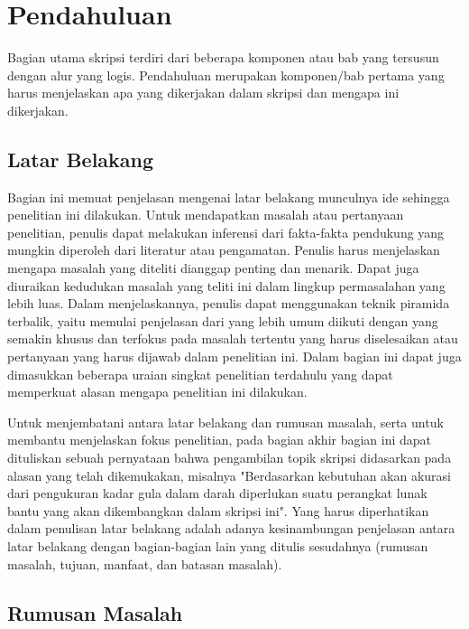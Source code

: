 \newpage
{}
\setcounter{page}{1}


\chapter{Pendahuluan}


Bagian utama skripsi terdiri dari beberapa komponen atau bab yang tersusun dengan alur yang logis. Pendahuluan merupakan komponen/bab pertama yang harus menjelaskan apa yang dikerjakan dalam skripsi dan mengapa ini dikerjakan. 

\section{Latar Belakang}

Bagian ini memuat penjelasan mengenai latar belakang munculnya ide sehingga penelitian ini dilakukan. Untuk mendapatkan masalah atau pertanyaan penelitian, penulis dapat melakukan inferensi dari fakta-fakta pendukung yang mungkin diperoleh dari literatur atau pengamatan. Penulis harus menjelaskan mengapa masalah yang diteliti dianggap penting dan menarik. Dapat juga diuraikan kedudukan masalah yang teliti ini dalam lingkup permasalahan yang lebih luas. Dalam menjelaskannya, penulis dapat menggunakan teknik piramida terbalik, yaitu memulai penjelasan dari yang lebih umum diikuti dengan yang semakin khusus dan terfokus pada masalah tertentu yang harus diselesaikan atau pertanyaan yang harus dijawab dalam penelitian ini. Dalam bagian ini dapat juga dimasukkan beberapa uraian singkat penelitian terdahulu yang dapat memperkuat alasan mengapa penelitian ini dilakukan. 

Untuk menjembatani antara latar belakang dan rumusan masalah, serta untuk membantu menjelaskan fokus penelitian, pada bagian akhir bagian ini dapat dituliskan sebuah pernyataan bahwa pengambilan topik skripsi didasarkan pada alasan yang telah dikemukakan, misalnya "Berdasarkan kebutuhan akan akurasi dari pengukuran kadar gula dalam darah diperlukan suatu perangkat lunak bantu yang akan dikembangkan dalam skripsi ini". Yang harus diperhatikan dalam penulisan latar belakang adalah adanya kesinambungan penjelasan antara latar belakang dengan bagian-bagian lain yang ditulis sesudahnya (rumusan masalah, tujuan, manfaat, dan batasan masalah).


\section{Rumusan Masalah}

